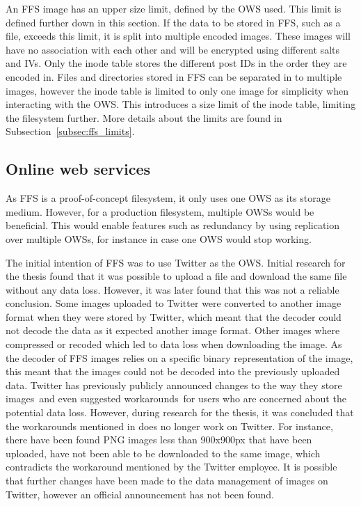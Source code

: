 An FFS image has an upper size limit, defined by the OWS used. This limit is defined further down in this section. If the data to be stored in FFS, such as a file, exceeds this limit, it is split into multiple encoded images. These images will have no association with each other and will be encrypted using different salts and IVs. Only the inode table stores the different post IDs in the order they are encoded in. Files and directories stored in FFS can be separated in to multiple images, however the inode table is limited to only one image for simplicity when interacting with the OWS. This introduces a size limit of the inode table, limiting the filesystem further. More details about the limits are found in Subsection~\ref{subsec:ffs_limits}.

\subsection{Online web services}
As FFS is a proof-of-concept filesystem, it only uses one OWS as its storage medium. However, for a production filesystem, multiple OWSs would be beneficial. This would enable features such as redundancy by using replication over multiple OWSs, for instance in case one OWS would stop working.

The initial intention of FFS was to use Twitter as the OWS. Initial research for the thesis found that it was possible to upload a file and download the same file without any data loss. However, it was later found that this was not a reliable conclusion. Some images uploaded to Twitter were converted to another image format when they were stored by Twitter, which meant that the decoder could not decode the data as it expected another image format. Other images where compressed or recoded which led to data loss when downloading the image. As the decoder of FFS images relies on a specific binary representation of the image, this meant that the images could not be decoded into the previously uploaded data. Twitter has previously publicly announced changes to the way they store images\,\cite{nolanobrienUpcomingChangesPNG2018} and even suggested workarounds\,\cite{nolanobrienFeedbackUpcomingChanges2019} for users who are concerned about the potential data loss. However, during research for the thesis, it was concluded that the workarounds mentioned in \cite{nolanobrienFeedbackUpcomingChanges2019} does no longer work on Twitter. For instance, there have been found PNG images less than 900x900px that have been uploaded, have not been able to be downloaded to the same image, which contradicts the workaround mentioned by the Twitter employee. It is possible that further changes have been made to the data management of images on Twitter, however an official announcement has not been found.


